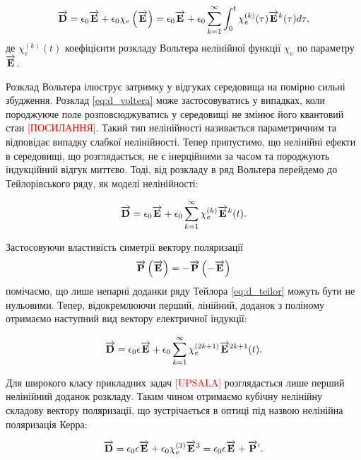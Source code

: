 \begin{equation} \label{eq:d_voltera}
\overrightarrow{\mathbf D} = \epsilon_0 \overrightarrow{\mathbf E} + \epsilon_0 \chi_e \left( \overrightarrow{\mathbf E} \right) = 
\epsilon_0 \overrightarrow{\mathbf E} + \epsilon_0 \sum_{k=1}^{\infty} \int_0^t
\chi_e^{(k)} (\tau) \overrightarrow{\mathbf E}^k (\tau) d \tau,
\end{equation}
%
де $\chi_e^{(k)} (t) $ коефіцієнти розкладу Вольтера нелінійної функції 
$ \chi_e $ по параметру $ \overrightarrow{\mathbf E} $.

Розклад Вольтера ілюструє затримку у відгуках середовища на помірно сильні 
збудження. Розклад \eqref{eq:d_voltera} може застосовуватись у випадках,
коли породжуюче поле розповсюджуватись у середовищі не змінює його квантовий
стан \textcolor{red}{[ПОСИЛАННЯ]}. Такий тип нелінійності називається 
параметричним та відповідає випадку слабкої нелінійності. Тепер припустимо, 
що нелінійні ефекти в середовищі, що розглядається, не є інерційними за часом 
та породжують індукційний відгук миттєво. Тоді, від розкладу в ряд Вольтера 
перейдемо до Тейлорівського ряду, як моделі нелінійності:

\begin{equation} \label{eq:d_teilor}
\overrightarrow{\mathbf D} = \epsilon_0 \overrightarrow{\mathbf E} + 
\epsilon_0 \sum_{k=1}^{\infty} \chi_e^{(k)} \overrightarrow{\mathbf E}^k (t).
\end{equation}

Застосовуючи властивість симетрії вектору поляризації 
%
\begin{equation}
\overrightarrow{\mathbf P} \left( \overrightarrow{\mathbf E} \right) = - \overrightarrow{\mathbf P} \left( - \overrightarrow{\mathbf E} \right)
\end{equation}
%
помічаємо, що лише непарні доданки ряду Тейлора \eqref{eq:d_teilor} можуть 
бути не нульовими. Тепер, відокремлюючи перший, лінійний, доданок з 
поліному отримаємо наступний вид вектору електричної індукції:

\begin{equation} \label{eq:d_teilor_odd}
\overrightarrow{\mathbf D} = \epsilon_0 \epsilon \overrightarrow{\mathbf E} + 
\epsilon_0 \sum_{k=1}^{\infty} \chi_e^{(2k+1)} \overrightarrow{\mathbf E}^{2k+1} (t).
\end{equation}

Для широкого класу прикладних задач \textcolor{red}{[UPSALA]} розглядається
лише перший нелінійний доданок розкладу. Таким чином отримаємо кубічну 
нелінійну складову вектору поляризації, що зустрічається в оптиці під 
назвою нелінійна поляризація Керра:

\begin{equation} \label{eq:d_kerr}
\overrightarrow{\mathbf D} = 
\epsilon_0 \epsilon \overrightarrow{\mathbf E} + \epsilon_0 \chi_e^{(3)} \overrightarrow{\mathbf E}^{3} = 
\epsilon_0 \epsilon \overrightarrow{\mathbf E} + \overrightarrow{\mathbf P}^\prime.
\end{equation}

